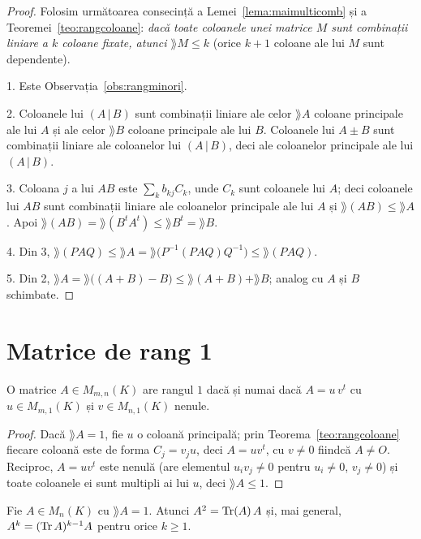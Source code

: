 \begin{proof}
Folosim următoarea consecință a Lemei~\ref{lema:maimulticomb} și a Teoremei~\ref{teo:rangcoloane}: \emph{dacă toate coloanele unei matrice $M$ sunt combinații liniare a $k$ coloane fixate, atunci $\rang M\le k$} (orice $k+1$ coloane ale lui $M$ sunt dependente).

1. Este Observația~\ref{obs:rangminori}.

2. Coloanele lui $(A\,|\,B)$ sunt combinații liniare ale celor $\rang A$ coloane principale ale lui $A$ și ale celor $\rang B$ coloane principale ale lui $B$. Coloanele lui $A\pm B$ sunt combinații liniare ale coloanelor lui $(A\,|\,B)$, deci ale coloanelor principale ale lui $(A\,|\,B)$.

3. Coloana $j$ a lui $AB$ este $\sum_kb_{kj}C_k$, unde $C_k$ sunt coloanele lui $A$; deci coloanele lui $AB$ sunt combinații liniare ale coloanelor principale ale lui $A$ și $\rang(AB)\le\rang A$. Apoi $\rang(AB)=\rang(B^tA^t)\le\rang B^t=\rang B$.

4. Din 3, $\rang(PAQ)\le\rang A=\rang\bigl(P^{-1}(PAQ)Q^{-1}\bigr)\le\rang(PAQ)$.

5. Din 2, $\rang A=\rang\bigl((A+B)-B\bigr)\le\rang(A+B)+\rang B$; analog cu $A$ și $B$ schimbate.
\end{proof}

\section{Matrice de rang 1}

\begin{propozitie}\label{prop:rang1}
O matrice $A\in M_{m,n}(K)$ are rangul $1$ dacă și numai dacă $A=u\,v^t$ cu $u\in M_{m,1}(K)$ și $v\in M_{n,1}(K)$ nenule.
\end{propozitie}

\begin{proof}
Dacă $\rang A=1$, fie $u$ o coloană principală; prin Teorema~\ref{teo:rangcoloane} fiecare coloană este de forma $C_j=v_ju$, deci $A=uv^t$, cu $v\neq0$ fiindcă $A\neq O$. Reciproc, $A=uv^t$ este nenulă (are elementul $u_iv_j\neq0$ pentru $u_i\neq0$, $v_j\neq0$) și toate coloanele ei sunt multipli ai lui $u$, deci $\rang A\le1$.
\end{proof}

\begin{lema}\label{lema:rang1}
Fie $A\in M_n(K)$ cu $\rang A=1$. Atunci $A^2=\operatorname{Tr}(A)\,A$ și, mai general, $A^k=(\operatorname{Tr} A)^{k-1}A$ pentru orice $k\ge1$.
\end{lema}

